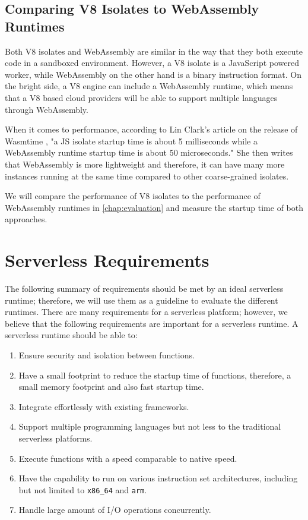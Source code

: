 \subsection{Comparing V8 Isolates to WebAssembly Runtimes}

Both \gls{V8} isolates and WebAssembly are similar in the way that they both execute code in a sandboxed environment. However, a V8 isolate is a JavaScript powered worker, while WebAssembly on the other hand is a binary instruction format. On the bright side, a V8 engine can include a WebAssembly runtime, which means that a V8 based cloud providers will be able to support multiple languages through WebAssembly. 

When it comes to performance, according to Lin Clark's article on the release of Wasmtime \cite{clark_2022_wasmtime}, "a JS isolate startup time is about 5 milliseconds while a WebAssembly runtime startup time is about 50 microseconds." She then writes that WebAssembly is more lightweight and therefore, it can have many more instances running at the same time compared to other coarse-grained isolates. 

We will compare the performance of V8 isolates to the performance of WebAssembly runtimes in \autoref{chap:evaluation} and measure the startup time of both approaches.

\section{Serverless Requirements}
\label{sec:serverless-requirements}

The following summary of requirements should be met by an ideal serverless runtime; therefore, we will use them as a guideline to evaluate the different runtimes. There are many requirements for a serverless platform; however, we believe that the following requirements are important for a serverless runtime.
A serverless runtime should be able to:
%
\begin{enumerate}
	\item Ensure security and isolation between functions.
	\item Have a small footprint to reduce the startup time of functions, therefore, a small memory footprint and also fast startup time. 
	\item Integrate effortlessly with existing frameworks. 
	\item Support multiple programming languages but not less to the traditional serverless platforms. 
	\item Execute functions with a speed comparable to native speed.
	\item Have the capability to run on various instruction set architectures, including but not limited to \texttt{x86\_64} and \texttt{arm}.
	\item Handle large amount of I/O operations concurrently.
\end{enumerate}

